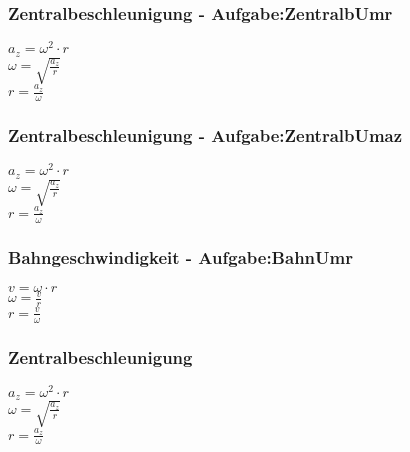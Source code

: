\subsubsection{Zentralbeschleunigung - Aufgabe:ZentralbUmr} 
\begin{minipage}{0.45\textwidth} 
$ a_{z}  = \omega ^{2} \cdot r $\\ 
$ \omega  = \sqrt{\frac{a_{z} }{r}} $\\ 
$ r = \frac{a_{z} }{\omega } $\\ 
\end{minipage} 
\begin{minipage}{0.45\textwidth} 
 
\end{minipage} 
\subsubsection{Zentralbeschleunigung - Aufgabe:ZentralbUmaz} 
\begin{minipage}{0.45\textwidth} 
$ a_{z}  = \omega ^{2} \cdot r $\\ 
$ \omega  = \sqrt{\frac{a_{z} }{r}} $\\ 
$ r = \frac{a_{z} }{\omega } $\\ 
\end{minipage} 
\begin{minipage}{0.45\textwidth} 
 
\end{minipage} 
\subsubsection{Bahngeschwindigkeit - Aufgabe:BahnUmr} 
\begin{minipage}{0.45\textwidth} 
$ v = \omega \cdot r $\\ 
$ \omega  = \frac{v}{r} $\\ 
$ r = \frac{v}{\omega } $\\ 
\end{minipage} 
\begin{minipage}{0.45\textwidth} 
 
\end{minipage} 
\subsubsection{Zentralbeschleunigung} 
\begin{minipage}{0.45\textwidth} 
$ a_{z}  = \omega ^{2} \cdot r $\\ 
$ \omega  = \sqrt{\frac{a_{z} }{r}} $\\ 
$ r = \frac{a_{z} }{\omega } $\\ 
\end{minipage} 
\begin{minipage}{0.45\textwidth} 
 
\end{minipage} 
